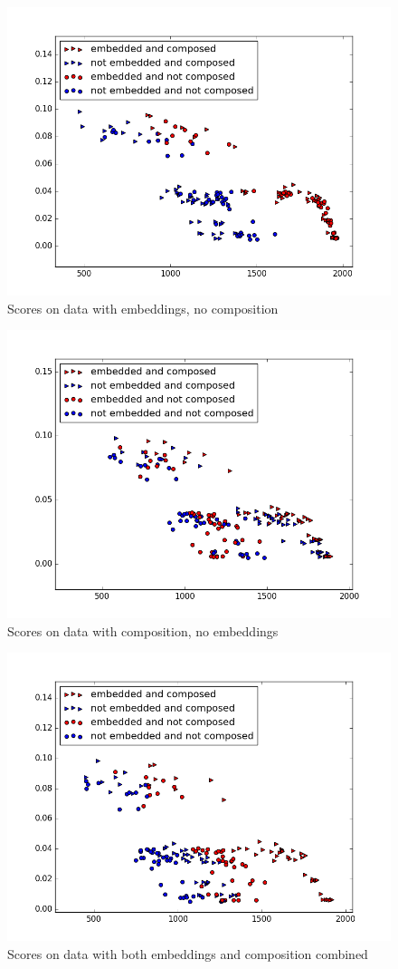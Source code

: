 \begin{figure}
\centering
\includegraphics[width=.8\linewidth]{ext/figure_embed_com.png}
\caption{Scores on data with embeddings, no composition}
\label{fig:embed_com}
\end{figure}


\begin{figure}
\centering
\includegraphics[width=.8\linewidth]{ext/figure_comp_com.png}
\caption{Scores on data with composition, no embeddings}
\label{fig:comp_com}
\end{figure}


\begin{figure}
\centering
\includegraphics[width=.8\linewidth]{ext/figure_x_com.png}
\caption{Scores on data with both embeddings and composition combined}
\label{fig:x_com}
\end{figure}

